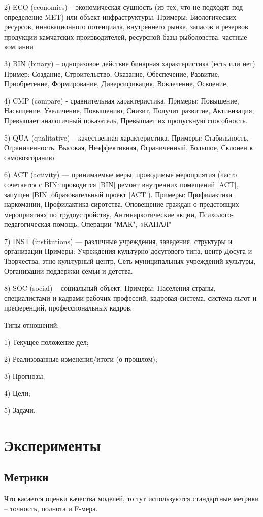 \documentclass{article}
\begin{document}
2) ECO (economics) – экономическая сущность (из тех, что не подходят под определение MET) или объект инфраструктуры. 
Примеры: Биологических ресурсов, инновационного потенциала, внутреннего рынка, запасов и резервов продукции камчатских производителей, ресурсной базы рыболовства, частные компании
 
3) BIN (binary) – одноразовое действие бинарная характеристика (есть или нет) 
Пример: Создание, Строительство, Оказание, Обеспечение, Развитие, Приобретение, Формирование, Диверсификация, Вовлечение, Освоение, 

4) CMP (compare) - сравнительная характеристика. 
Примеры: Повышение, Насыщение, Увеличение, Повышению, Снизит, Получит развитие, Активизация, Превышает аналогичный показатель, Превышает их пропускную способность. 

5) QUA (qualitative) – качественная характеристика. 
Примеры: Стабильность, Ограниченность, Высокая, Неэффективная, Ограниченный, Большое, Склонен к самовозгоранию. 

6) ACT (activity) — принимаемые меры, проводимые мероприятия (часто сочетается с BIN: проводится [BIN] ремонт внутренних помещений [ACT], запущен [BIN] образовательный проект [ACT]). 
Примеры: Профилактика наркомании, Профилактика сиротства, Оповещение граждан о предстоящих мероприятиях по трудоустройству, Антинаркотические акции, Психолого-педагогическая помощь, Операции "МАК", «КАНАЛ" 

7) INST (institutions) — различные учреждения, заведения, структуры и организации 
Примеры: Учреждения культурно-досугового типа, центр Досуга и Творчества, этно-культурный центр, Сеть муниципальных учреждений культуры, Организации поддержки семьи и детства. 

8) SOC (social) – социальный объект. 
Примеры: Населения страны, специалистами и кадрами рабочих профессий, кадровая система, система льгот и преференций, профессиональных кадров.

Типы отношений: 

1) Текущее положение дел;

2) Реализованные изменения/итоги (о прошлом);

3) Прогнозы;

4) Цели;

5) Задачи.


\section{Эксперименты}
\subsection{Метрики}
Что касается оценки качества моделей, то тут используются стандартные метрики – точность, полнота и F-мера. 
\end{document}
